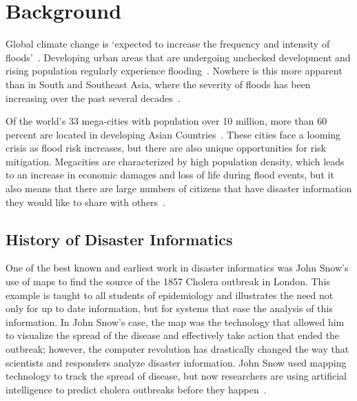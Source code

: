 \chapter{Background}

Global climate change is `expected to increase the frequency and intensity of
floods'~\cite{ahernGlobalHealthImpacts2005}. Developing urban areas that are
undergoing unchecked development and rising population regularly experience
flooding~\cite{chanFloodRiskAsia2012}.  Nowhere is this more apparent than
in South and Southeast Asia, where the severity of floods has been increasing
over the past several decades~\cite{tortiFloodsSoutheastAsia2012}.

Of the world's 33 mega-cities with population over 10 million, more than 60
percent are located in developing Asian
Countries~\cite{unitednationsdepartmentofeconomicandsocialaffairsWorldCities20162016}.
These cities face a looming crisis as flood risk increases, but there are also
unique opportunities for risk mitigation. Megacities are characterized by high
population density, which leads to an increase in economic damages and loss of
life during flood events, but it also means that there are large numbers of
citizens that have disaster information they would like to share with
others~\cite{chanFloodRiskAsia2012}.

\section{History of Disaster Informatics} One of the best known and earliest
work in disaster informatics was John Snow's use of maps to find the source of
the 1857 Cholera outbreak in London\cite{rogersJohnSnowData2013}. This example
is taught to all students of epidemiology and illustrates the need
not only for up to date information, but for systems that ease the
analysis of this information. In John Snow's case, the map was the technology
that allowed him to visualize the spread of the disease and effectively take
action that ended the outbreak; however, the computer revolution has drastically
changed the way that scientists and responders analyze disaster information.
John Snow used mapping technology to track the spread of disease, but now
researchers are using artificial intelligence to predict cholera outbreaks
before they happen~\cite{radinskyMiningWebPredict2013}.

